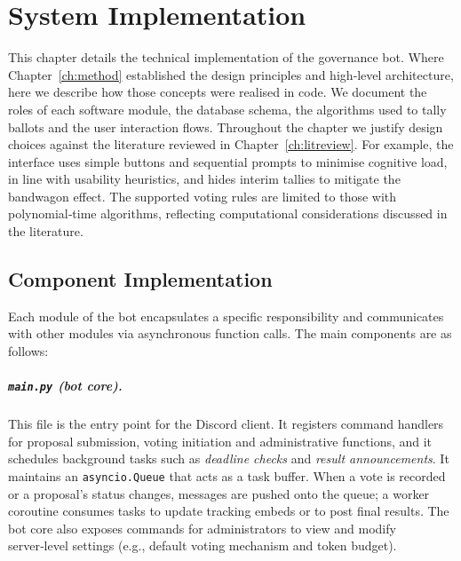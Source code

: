 \doublespacing %

\chapter{System Implementation}
\label{ch:implementation}

\begin{spacing}{1} %
\minitoc %
\end{spacing} %
\thesisspacing %

This chapter details the technical implementation of the governance bot.
Where Chapter~\ref{ch:method} established the design principles and
high‑level architecture, here we describe how those concepts were
realised in code.  We document the roles of each software module, the
database schema, the algorithms used to tally ballots and the user
interaction flows.  Throughout the chapter we justify design choices
against the literature reviewed in Chapter~\ref{ch:litreview}.  For
example, the interface uses simple buttons and sequential prompts to
minimise cognitive load, in line with usability heuristics, and hides
interim tallies to mitigate the bandwagon effect.  The supported voting
rules are limited to those with polynomial‑time algorithms, reflecting
computational considerations discussed in the literature.

\section{Component Implementation}

Each module of the bot encapsulates a specific responsibility and
communicates with other modules via asynchronous function calls.  The
main components are as follows:

\paragraph{\texttt{main.py} (bot core).}  This file is the entry point
for the Discord client.  It registers command handlers for proposal
submission, voting initiation and administrative functions, and it
schedules background tasks such as \emph{deadline checks} and
\emph{result announcements}.  It maintains an \texttt{asyncio.Queue}
that acts as a task buffer.  When a vote is recorded or a proposal’s
status changes, messages are pushed onto the queue; a worker coroutine
consumes tasks to update tracking embeds or to post final results.  The
bot core also exposes commands for administrators to view and modify
server‑level settings (e.g., default voting mechanism and token
budget).

